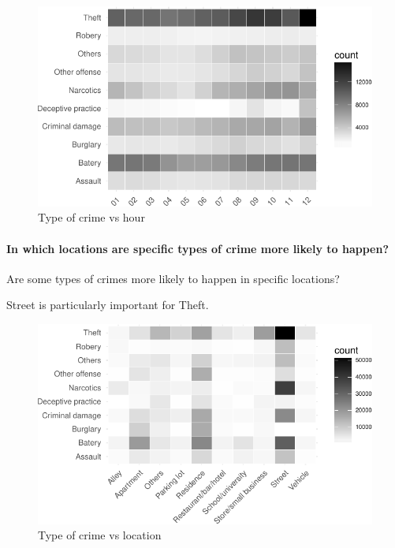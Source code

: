 \documentclass[]{article}
\let\oldparagraph\paragraph
\renewcommand{\paragraph}[1]{\oldparagraph{#1}\mbox{}}
\begin{document}
\begin{figure}[H]

{\centering \includegraphics{Assessment_1v8_files/figure-latex/fig9-1} 

}

\caption{Type of crime vs hour}\label{fig:fig9}
\end{figure}

\paragraph{In which locations are specific types of crime more likely to
happen?}\label{in-which-locations-are-specific-types-of-crime-more-likely-to-happen}

Are some types of crimes more likely to happen in specific locations?

Street is particularly important for Theft.

\begin{figure}[H]

{\centering \includegraphics{Assessment_1v8_files/figure-latex/fig11-1} 

}

\caption{Type of crime vs location}\label{fig:fig11}
\end{figure}
\end{document}
